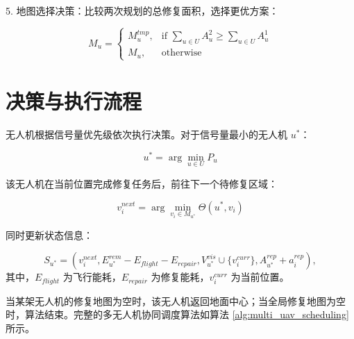 \documentclass[AutoFakeBold]{LZUThesis}
\begin{document}
5. 地图选择决策：比较两次规划的总修复面积，选择更优方案：

\begin{equation}
	M_u =
	\begin{cases}
		M_u^{tmp}, & \text{if } \sum_{u \in U} A_u^2 \geq \sum_{u \in U} A_u^1 \\
		M_u, & \text{otherwise}
	\end{cases}
\end{equation}

\section{决策与执行流程}

无人机根据信号量优先级依次执行决策。对于信号量最小的无人机 $u^*$：

\begin{equation}
	u^* = \arg\min_{u \in U} P_u
\end{equation}

该无人机在当前位置完成修复任务后，前往下一个待修复区域：

\begin{equation}
	v_i^{next} = \arg\min_{v_i \in M_{u^*}} \Theta(u^*,v_i)
\end{equation}

同时更新状态信息：

\begin{equation}
	S_{u^*} = (v_i^{next}, E_{u^*}^{rem} - E_{flight} - E_{repair}, V_{u^*}^{vis} \cup \{v_i^{curr}\}, A_{u^*}^{rep} + a_i^{rep}),
\end{equation}
其中，$E_{flight}$ 为飞行能耗，$E_{repair}$ 为修复能耗，$v_i^{curr}$ 为当前位置。

当某架无人机的修复地图为空时，该无人机返回地面中心；当全局修复地图为空时，算法结束。完整的多无人机协同调度算法如算法 \ref{alg:multi_uav_scheduling} 所示。
\end{document}
